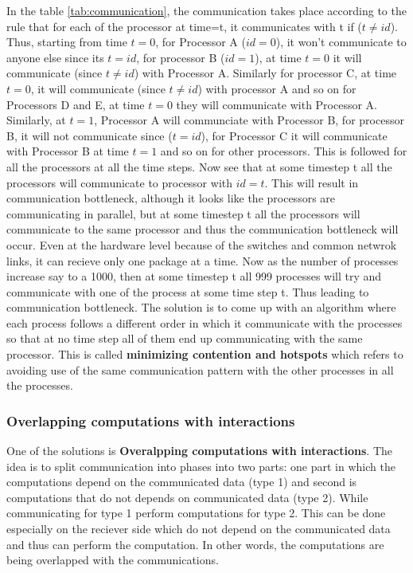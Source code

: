 \documentclass[12pt]{article}
\begin{document}
In the table \ref{tab:communication}, 
the communication takes place according to the rule that for each of the processor at time=t, it communicates with t if ($t\neq id$).
Thus, starting from time $t=0$, for Processor A ($id=0$), it won't communicate to anyone else since its $t=id$, for processor B ($id=1$), at time $t=0$
it will communicate (since $t\neq id$) with Processor A.
Similarly for processor C, at time $t=0$, it will communicate (since $t\neq id$) with processor A and so on for Processors D and E, at time $t=0$ they will communicate with Processor A. 
Similarly, at $t=1$, Processor A will communciate with Processor B, for processor B, it will not communicate since ($t =id$), for Processor C it will communicate with Processor B at time $t=1$ and so on for other processors.
This is followed for all the processors at all the time steps.
Now see that at some timestep t all the processors will communicate to processor with $id=t$. This will result in communication bottleneck, although it looks like the processors are communicating in parallel,
but at some timestep t all the processors will communicate to the same processor and thus the communication bottleneck will occur. Even at the hardware level because of the switches and common netwrok links, it can recieve only one package at a time.
Now as the number of processes increase say to a 1000, then at some timestep t all 999 processes will try and communicate with one of the process at some time step t. Thus leading to communication bottleneck.
The solution is to come up with an algorithm where each process follows a different order in which it communicate with the processes so that at no time step all of them end up communicating with the same processor.
This is called \textbf{minimizing contention and hotspots} which refers to avoiding use of the same communication pattern with the other processes in all the processes.

\subsubsection{Overlapping computations with interactions}
One of the solutions is \textbf{Overalpping computations with interactions}. The idea is to split communication into phases into two parts: one part in which the computations depend 
on  the communicated data (type 1) and second is computations that do not depends on communicated data (type 2). While communicating for type 1 perform computations for type 2.
This can be done especially on the reciever side which do not depend on the communicated data and thus can perform the computation. In other words, the computations are being overlapped with the communications.
\end{document}
